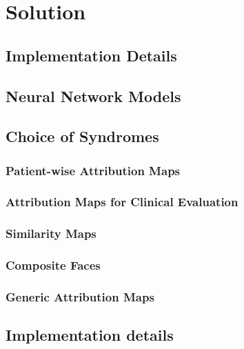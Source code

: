 \documentclass[../report.tex]{subfiles}
\begin{document}
    \chapter{Solution}
    \section{Implementation Details}
    \section{Neural Network Models}
    \section{Choice of Syndromes}
    \subsection{Patient-wise Attribution Maps}
    \subsection{Attribution Maps for Clinical Evaluation}
    \subsection{Similarity Maps}
    \subsection{Composite Faces}
    \subsection{Generic Attribution Maps}

    \section{Implementation details}
\end{document}
